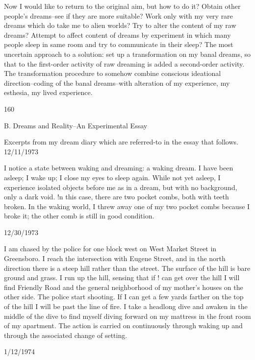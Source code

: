 \documentclass[10pt,twoside]{memoir}
\begin{document}
\begin{enumerate}
{Now I would like to return to the original aim, but how to do it? Obtain 
other people's dreams--see if they are more suitable? Work only with my 
very rare dreams which do take me to alien worlds? Try to alter the content 
of my raw dreams? Attempt to affect content of dreams by experiment in 
which many people sleep in same room and try to communicate in their 
sleep? The most uncertain approach to a solution: set up a transformation 
on my banal dreams, so that to the first-order activity of raw dreaming is 
added a second-order activity. The transformation procedure to somehow 
combine conscious ideational direction--coding of the banal dreams--with 
alteration of my experience, my esthesia, my lived experience. 


160 


B. Dreams and Reality--An Experimental Essay 


Excerpts from my dream diary which are referred-to in the essay that 
follows. 
12/11/1973 

I notice a state between waking and dreaming: a waking dream. I have 
been asleep; I wake up; I close my eyes to sleep again. While not yet asleep, I 
experience isolated objects before me as in a dream, but with no 
background, only a dark void. !n this case, there are two pocket combs, both 
with teeth broken. In the waking world, I threw away one of my two pocket 
combs because I broke it; the other comb is still in good condition. 


12/30/1973 

I am chased by the police for one block west on West Market Street in 
Greensboro. I reach the intersection with Eugene Street, and in the north 
direction there is a steep hill rather than the street. The surface of the hill is 
bare ground and grass. I run up the hill, sensing that if ! can get over the hill 
I will find Friendly Road and the general neighborhood of my mother's 
houses on the other side. The police start shooting. If I can get a few yards 
farther on the top of the hill I will be past the line of fire. I take a headlong 
dive and awaken in the middle of the dive to find myself diving forward on 
my mattress in the front room of my apartment. The action is carried on 
continuously through waking up and through the associated change of 
setting. 


1/12/1974 

}
\end{enumerate}
\end{document}
